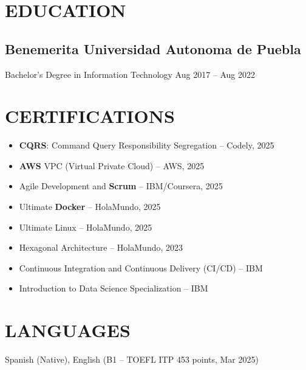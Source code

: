 \documentclass[a4paper,10pt]{article}
\newcommand{\kw}[1]{\textbf{\textcolor{keyword}{#1}}}
\newcommand{\tech}[1]{\textbf{\textcolor{tech}{#1}}}
\begin{document}
\section*{EDUCATION}

\subsection*{Benemerita Universidad Autonoma de Puebla}
Bachelor's Degree in Information Technology \hfill Aug 2017 -- Aug 2022

\section*{CERTIFICATIONS}
\begin{itemize}[noitemsep, leftmargin=*]
    \item \kw{CQRS}: Command Query Responsibility Segregation -- Codely, 2025
    \item \tech{AWS} VPC (Virtual Private Cloud) -- AWS, 2025
    \item Agile Development and \kw{Scrum} -- IBM/Coursera, 2025
    \item Ultimate \tech{Docker} -- HolaMundo, 2025
    \item Ultimate Linux -- HolaMundo, 2025
    \item Hexagonal Architecture -- HolaMundo, 2023
    \item Continuous Integration and Continuous Delivery (CI/CD) -- IBM
    \item Introduction to Data Science Specialization -- IBM
\end{itemize}

\section*{LANGUAGES}
Spanish (Native), English (B1 -- TOEFL ITP 453 points, Mar 2025)
\end{document}
